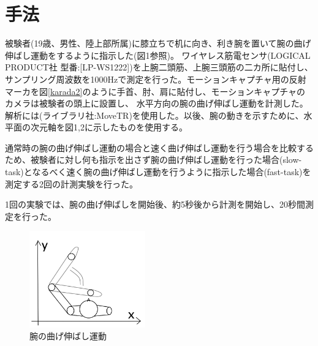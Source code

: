 \documentclass{jsarticle}
\begin{document}

\section{手法}
被験者(19歳、男性、陸上部所属)に膝立ちで机に向き、利き腕を置いて腕の曲げ伸ばし運動をするように指示した(図1参照)。
ワイヤレス筋電センサ(LOGICAL PRODUCT社 型番:[LP-WS1222])を上腕二頭筋、上腕三頭筋の二カ所に貼付し、サンプリング周波数を1000Hzで測定を行った。モーションキャプチャ用の反射マーカを図\ref{karada2}のように手首、肘、肩に貼付し、モーションキャプチャのカメラは被験者の頭上に設置し、
水平方向の腕の曲げ伸ばし運動を計測した。解析には(ライブラリ社:MoveTR)を使用した。以後、腕の動きを示すために、水平面の次元軸を図1,2に示したものを使用する。

通常時の腕の曲げ伸ばし運動の場合と速く曲げ伸ばし運動を行う場合を比較するため、被験者に対し何も指示を出さず腕の曲げ伸ばし運動を行った場合(slow-task)となるべく速く腕の曲げ伸ばし運動を行うように指示した場合(fast-task)を測定する2回の計測実験を行った。

1回の実験では、腕の曲げ伸ばしを開始後、約5秒後から計測を開始し、20秒間測定を行った。

\begin{figure}[htb]
  \begin{center}
    \includegraphics[width=5cm]{karada1.png}
    \caption{腕の曲げ伸ばし運動}
    \label{karada1}
  \end{center}
\end{figure}
\end{document}
